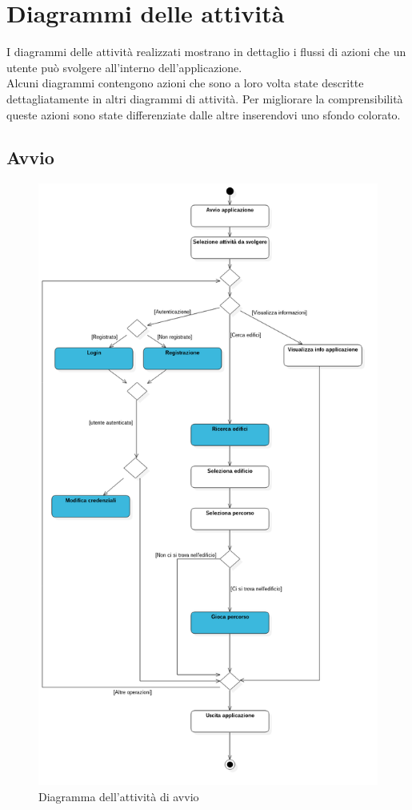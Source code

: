 \section{Diagrammi delle attività} 
\label{attivita}
I diagrammi delle attività realizzati mostrano in dettaglio i flussi di azioni che un utente può svolgere all'interno dell'applicazione. \\
Alcuni diagrammi contengono azioni che sono a loro volta state descritte dettagliatamente in altri diagrammi di attività. Per migliorare la comprensibilità queste azioni sono state differenziate dalle altre inserendovi uno sfondo colorato.

\newpage

\subsection{Avvio}

\begin{figure}[!h]
	\centering
	\includegraphics[scale=0.4]{img/attivita/avvio}  
	\caption{Diagramma dell'attività di avvio}
\end{figure}

